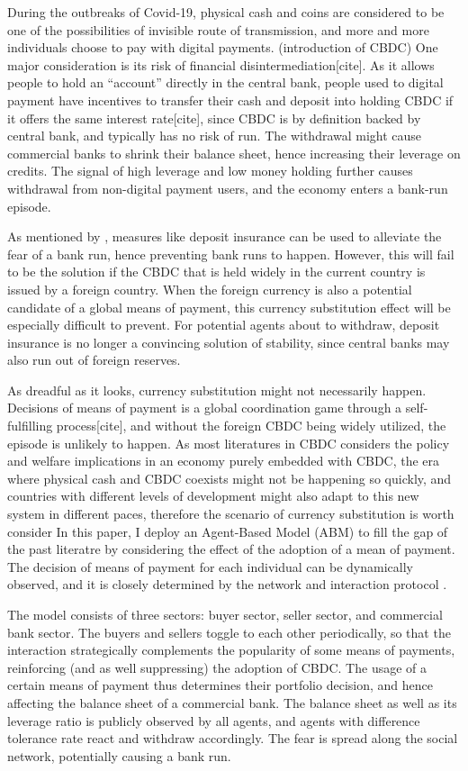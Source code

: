 During the outbreaks of Covid-19, physical cash and coins are considered to be
one of the possibilities of invisible route of transmission, and more and more
individuals choose to pay with digital payments.
(introduction of CBDC)
One major consideration is its risk of financial disintermediation[cite].  As it
allows people to hold an ``account'' directly in the central bank, people used
to digital payment have incentives to transfer their cash and deposit into
holding CBDC if it offers the same interest rate[cite], since CBDC is by
definition backed by central bank, and typically has no risk of run. The
withdrawal might cause commercial banks to shrink their balance sheet, hence
increasing their leverage on credits.  The signal of high leverage and low money
holding further causes withdrawal from non-digital payment users, and the
economy enters a bank-run episode.

As mentioned by \citet*{DD83}, measures like deposit insurance can be used to
alleviate the fear of a bank run, hence preventing bank runs to happen. However,
this will fail to be the solution if the CBDC that is held widely in the current
country is issued by a foreign country. When the foreign currency is also a
potential candidate of a global means of payment, this currency substitution
effect will be especially difficult to prevent.
For potential agents about to withdraw, deposit insurance is no longer a
convincing solution of stability, since central banks may also run out of foreign reserves.

As dreadful as it looks, currency substitution might not necessarily happen.
Decisions of means of payment is a global coordination game through a
self-fulfilling process[cite], and without the foreign CBDC being widely
utilized, the episode is unlikely to happen.
As most literatures in CBDC considers the policy and welfare implications in an
economy purely embedded with CBDC, the era where physical cash and CBDC coexists
might not be happening so quickly, and countries with different levels of
development might also adapt to this new system in different paces, therefore the
scenario of currency substitution is worth consider
In this paper, I deploy an Agent-Based Model (ABM) to fill the gap of the past
literatre by considering the effect of the adoption of a mean of payment. The
decision of means of payment for each individual can be dynamically observed,
and it is closely determined by the network and interaction protocol \citep*{KW98}.

The model consists of three sectors: buyer sector, seller sector, and commercial
bank sector. The buyers and sellers toggle to each other periodically, so that
the interaction strategically complements the popularity of some means of
payments, reinforcing (and as well suppressing) the adoption of CBDC. The
usage of a certain means of payment thus determines their portfolio decision,
and hence affecting the balance sheet of a commercial bank. The balance sheet as
well as its leverage ratio is publicly observed by all agents, and agents with
difference tolerance rate react and withdraw accordingly. The fear is spread
along the social network, potentially causing a bank run.

